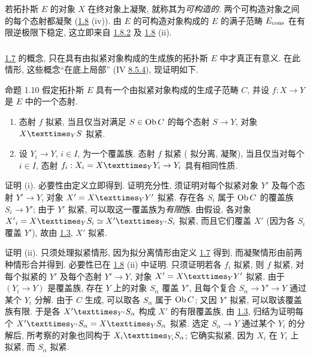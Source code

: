 \subsubsection{}
若拓扑斯 $E$ 的对象 $X$ 在终对象上凝聚,
就称其为\emph{可构造的}.
两个可构造对象之间的每个态射都凝聚
(\hyperref[VI.prop1.8]{1.8} (iv)).
由 $E$ 的可构造对象构成的 $E$ 的满子范畴 $E_{\operatorname{cons}}$
在有限逆极限下稳定,
这立即来自 \hyperref[VI.cor1.8.2]{1.8.2}
及 \hyperref[VI.prop1.8]{1.8} (ii).

\subsubsection{}
\hyperref[VI.def1.7]{1.7} 的概念,
只在具有由拟紧对象构成的生成族的拓扑斯 $E$ 中才真正有意义.
在此情形, 这些概念“在底上局部”
(IV \hyperref[IV.subsubsec8.5.4]{8.5.4}), 现证明如下.

\begin{enonce*}{命题 1.10}
假定\pageoriginale{}拓扑斯 $E$ 具有一个由拟紧对象构成的生成子范畴 $C$,
并设 $f:X\to Y$ 是 $E$ 中的一个态射.
\begin{enumerate}
\renewcommand{\theenumi}{\roman{enumi}}
\renewcommand{\labelenumi}{(\theenumi)}
\item 态射 $f$ 拟紧, 当且仅当对满足 $S\in\operatorname{Ob} C$ 的每个态射 $S\to Y$,
对象 $\fprod{X}{S}{Y}$ 拟紧.

\item 设 $Y_i\to Y$, $i\in I$, 为一个覆盖族.
态射 $f$ 拟紧 (\emph{\resp} 拟分离, \emph{\resp} 凝聚),
当且仅当对每个 $i\in I$,
态射 $f_i:X_i=\fprod{X}{Y_i}{Y}\to Y_i$ 具有相同性质.
\end{enumerate}
\end{enonce*}

证明 (i). 必要性由定义立即得到.
证明充分性, 须证明对每个拟紧对象 $Y'$ 及每个态射 $Y'\to Y$,
对象 $X'=\fprod{X}{Y'}{Y}$ 拟紧.
存在各 $S_i$ 属于 $\operatorname{Ob} C$ 的覆盖族 $S_i\to Y'$;
由于 $Y'$ 拟紧, 可以取这一覆盖族为\emph{有限}族.
由假设, 各对象
${X'}_i=\fprod{X}{S_i}{Y}\simeq\fprod{X'}{S_i}{Y'}$
拟紧, 而且它们覆盖 $X'$ (因为各 $S_i$ 覆盖 $Y'$),
故由 \hyperref[VI.prop1.3]{1.3}, $X'$ 拟紧.

证明 (ii). 只须处理拟紧情形,
因为拟分离情形由定义 \hyperref[VI.def1.7]{1.7} 得到,
而凝聚情形由前两种情形合并得到.
必要性已在 \hyperref[VI.prop1.8]{1.8} (ii) 中证明.
只须证明若各 $f_i$ 拟紧, 则 $f$ 拟紧,
\ie 对每个拟紧的 $Y'$ 及每个态射 $Y'\to Y$,
对象 $X'=\fprod{X}{Y'}{Y}$ 拟紧.
由于 $(Y_i\to Y)$ 是覆盖族,\pageoriginale{}
存在 $Y$ 上的对象 $S_{\alpha}$ 覆盖 $Y'$,
且每个复合 $S_{\alpha}\to Y'\to Y$ 通过某个 $Y_i$ 分解.
由于 $C$ 生成, 可以取各 $S_{\alpha}$ 属于 $\operatorname{Ob} C$;
又因 $Y'$ 拟紧, 可以取该覆盖族有限.
于是各 $\fprod{X'}{S_{\alpha}}{Y'}$ 构成 $X'$ 的有限覆盖族,
由 \hyperref[VI.prop1.3]{1.3},
归结为证明每个
$\fprod{X'}{S_{\alpha}}{Y'}=\fprod{X}{S_{\alpha}}{Y}$ 拟紧.
选定 $S_{\alpha}\to Y$ 通过某个 $Y_i$ 的分解后,
所考察的对象也同构于 $\fprod{X_i}{S_{\alpha}}{Y_i}$;
它确实拟紧, 因为 $X_i$ 在 $Y_i$ 上拟紧, 而 $S_{\alpha}$ 拟紧.

